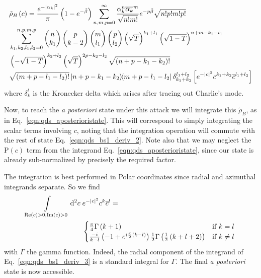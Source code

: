 \begin{align}\label{eqn:qds_bs1_deriv_2}
%
&\tilde{\rho}_B\left(c\right) = \frac{e^{-\left|\alpha_k\right|^2}}{\pi}\left(1 - e^{-\tilde{\beta}}\right) \sum_{n, m, p=0}^\infty \frac{\alpha_k^n \overline{\alpha_k}^m}{\sqrt{n! m!}} e^{- p \tilde{\beta}} \sqrt{n! p! m! p!} \notag \\
%
&\sum_{k_1, k_2, l_1, l_2=0}^{n, p, m, p} \pmqty{n \\ k_1} \pmqty{p \\ k-2} \pmqty{m \\ l_1} \pmqty{p \\ l_2} \left(\sqrt{T}\right)^{k_1 + l_1} \left(\sqrt{1-T}\right)^{n + m - k_1 - l_1} \notag \\
%
&\left(-\sqrt{1-T}\right)^{k_2 + l_2} \left(\sqrt{T}\right)^{2 p - k_2 - l_2} \sqrt{\left(n + p - k_1 - k_2\right)!} \notag \\
%
&\sqrt{\left(m + p - l_1 - l_2\right)!} \dyad{n + p - k_1 - k_2}{m + p - l_1 - l_2} \delta_{k_1+k_2}^{l_1+l_2} \left[ e^{-\left|c\right|^2} c^{k_1 + k_2} \overline{c}^{l_1 + l_2} \right]
%
\end{align}
where $\delta_k^l$ is the Kronecker delta which arises after tracing out Charlie's mode.

 Now, to reach the \emph{a posteriori} state under this attack we will integrate this $\tilde{\rho}_B$, as in Eq.~\ref{eqn:qds_aposterioristate}. This will correspond to simply integrating the scalar terms involving $c$, noting that the integration operation will commute with the rest of state Eq.~\ref{eqn:qds_bs1_deriv_2}. Note also that we may neglect the $\text{P}\left(c\right)$ term from the integrand Eq.~\ref{eqn:qds_aposterioristate}, since our state is already sub-normalized by precisely the required factor. 

The integration is best performed in Polar coordinates since radial and azimuthal integrands separate. So we find
\begin{align}\label{eqn:qds_bs1_deriv_3}
\int\limits_{\text{Re}\left(c\right)>0, \text{Im}\left(c\right)>0} \mathop{}\!\mathrm{d^2} c \; &e^{-\left|c\right|^2} c^k \overline{c}^l = \notag \\
&\begin{cases}
\frac{\pi}{4} \Gamma\left(k+1\right) & \text{if } k = l \\
\frac{-i}{k-l}\left(-1 + e^{i \frac{\pi}{2}\left(k-l\right)}\right)\frac{1}{2}\Gamma\left(\frac{1}{2}\left(k + l + 2\right) \right) & \text{if } k \ne l
\end{cases}
\end{align}
with $\Gamma$ the gamma function. Indeed, the radial component of the integrand of Eq.~\ref{eqn:qds_bs1_deriv_3} is a standard integral for $\Gamma$. The final \emph{a posteriori} state is now accessible. 


